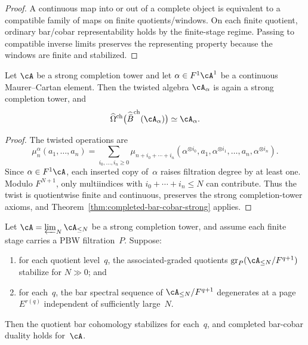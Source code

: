\begin{proof}
A continuous map into or out of a complete object is equivalent to a
compatible family of maps on finite quotients/windows. On each finite
quotient, ordinary bar/cobar representability holds by the finite-stage
regime. Passing to compatible inverse limits preserves the representing
property because the windows are finite and stabilized.
\end{proof}

\begin{theorem}
\label{thm:mc-twisting-closure}
Let $\cA$ be a strong completion tower and let
$\alpha \in F^1\cA^1$ be a continuous Maurer--Cartan element. Then the
twisted algebra $\cA_\alpha$ is again a strong completion tower, and
\[
\widehat\Omega^{\mathrm{ch}}\bigl(\widehat{\bar B}^{\mathrm{ch}}
(\cA_\alpha)\bigr) \simeq \cA_\alpha.
\]
\end{theorem}

\begin{proof}
The twisted operations are
\[
\mu_n^\alpha(a_1,\dots,a_n)
=
\sum_{i_0,\ldots,i_n \ge 0}
\mu_{n+i_0+\cdots+i_n}
(\alpha^{\otimes i_0},a_1,\alpha^{\otimes i_1},
\ldots,a_n,\alpha^{\otimes i_n}).
\]
Since $\alpha \in F^1\cA$, each inserted copy of~$\alpha$ raises
filtration degree by at least one. Modulo $F^{N+1}$, only multiindices
with $i_0+\cdots+i_n \le N$ can contribute. Thus the twist is
quotientwise finite and continuous, preserves the strong
completion-tower axioms, and Theorem~\ref{thm:completed-bar-cobar-strong}
applies.
\end{proof}

\begin{theorem}
\label{thm:uniform-pbw-bridge}
Let $\cA = \varprojlim_N \cA_{\le N}$ be a strong completion tower, and
assume each finite stage carries a PBW filtration~$P$. Suppose:
\begin{enumerate}
\item for each quotient level~$q$, the associated-graded quotients
 $\operatorname{gr}_P(\cA_{\le N}/F^{q+1})$ stabilize for $N \gg 0$;
 and
\item for each~$q$, the bar spectral sequence of $\cA_{\le N}/F^{q+1}$
 degenerates at a page $E^{r(q)}$ independent of sufficiently
 large~$N$.
\end{enumerate}
Then the quotient bar cohomology stabilizes for each~$q$, and completed
bar-cobar duality holds for~$\cA$.
\end{theorem}

